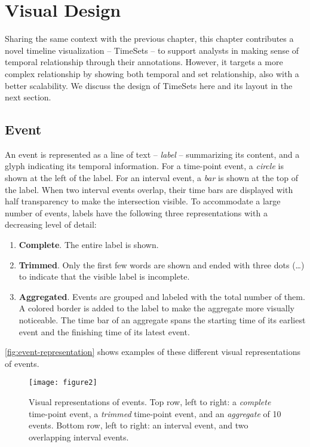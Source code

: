 \section{Visual Design}
Sharing the same context with the previous chapter, this chapter contributes a novel timeline visualization -- TimeSets -- to support analysts in making sense of temporal relationship through their annotations. However, it targets a more complex relationship by showing both temporal and set relationship, also with a better scalability. We discuss the design of TimeSets here and its layout in the next section.

\subsection{Event}
An event is represented as a line of text -- \emph{label} -- summarizing its content, and a glyph indicating its temporal information. For a time-point event, a \emph{circle} is shown at the left of the label. For an interval event, a \emph{bar} is shown at the top of the label. When two interval events overlap, their time bars are displayed with half transparency to make the intersection visible. To accommodate a large number of events, labels have the following three representations with a decreasing level of detail:
\begin{enumerate}
	\item \textbf{Complete}. The entire label is shown.
	\item \textbf{Trimmed}. Only the first few words are shown and ended with three dots (\dots) to indicate that the visible label is incomplete.
	\item \textbf{Aggregated}. Events are grouped and labeled with the total number of them. A colored border is added to the label to make the aggregate more visually noticeable. The time bar of an aggregate spans the starting time of its earliest event and the finishing time of its latest event.
\end{enumerate}

\autoref{fig:event-representation} shows examples of these different visual representations of events.

\begin{figure}[!htb]
\centering
\texttt{[image: figure2]}\caption{Visual representations of events. Top row, left to right: a \emph{complete} time-point event, a \emph{trimmed} time-point event, and an \emph{aggregate} of 10 events. Bottom row, left to right: an interval event, and two overlapping interval events.}
\label{fig:event-representation}
\end{figure}

